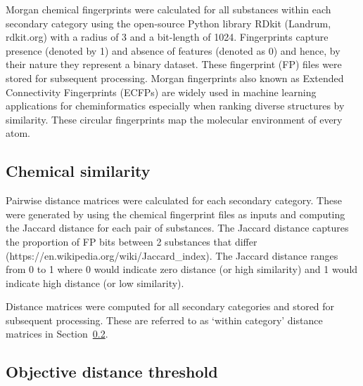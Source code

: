 \documentclass[
  super,
  preprint,
  3p]{elsarticle}
\begin{document}
Morgan chemical fingerprints \citep{rogers_extended-connectivity_2010}
were calculated for all substances within each secondary category using
the open-source Python library RDkit (Landrum, rdkit.org) with a radius
of 3 and a bit-length of 1024. Fingerprints capture presence (denoted by
1) and absence of features (denoted as 0) and hence, by their nature
they represent a binary dataset. These fingerprint (FP) files were
stored for subsequent processing. Morgan fingerprints also known as
Extended Connectivity Fingerprints (ECFPs) are widely used in machine
learning applications for cheminformatics \citep{oboyle_comparing_2016}
especially when ranking diverse structures by similarity. These circular
fingerprints map the molecular environment of every atom.

\hypertarget{sec-chem-sim}{%
\subsection{Chemical similarity}\label{sec-chem-sim}}

Pairwise distance matrices were calculated for each secondary category.
These were generated by using the chemical fingerprint files as inputs
and computing the Jaccard distance for each pair of substances. The
Jaccard distance captures the proportion of FP bits between 2 substances
that differ (https://en.wikipedia.org/wiki/Jaccard\_index). The Jaccard
distance ranges from 0 to 1 where 0 would indicate zero distance (or
high similarity) and 1 would indicate high distance (or low similarity).

Distance matrices were computed for all secondary categories and stored
for subsequent processing. These are referred to as `within category'
distance matrices in Section~\ref{sec-objective-threshold}.

\hypertarget{sec-objective-threshold}{%
\subsection{Objective distance
threshold}\label{sec-objective-threshold}}
\end{document}
